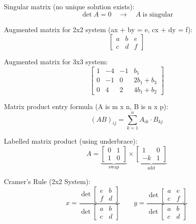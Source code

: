 Singular matrix (no unique solution exists):
$$\det A = 0 \quad \to \quad A \;\text{is singular}$$

Augmented matrix for 2x2 system (ax + by = e, cx + dy = f):
$$\left[ \begin{array}{cc|c} a & b & e \\ c & d & f \end{array} \right]$$

Augmented matrix for 3x3 system:
$$\left[ \begin{array}{ccc|c} 1 & -4 & -1 & b_1 \\ 0 & -1 & 0 & 2b_1 + b_3 \\ 0 & 4 & 2 & 4b_1 + b_2 \end{array} \right]$$

Matrix product entry formula (A is m x n, B is n x p):
$$(AB)_{ij} = \sum_{k=1}^n A_{ik} \cdot B_{kj}$$

Labelled matrix product (using underbrace):
$$A = \underbrace{\begin{bmatrix} 0 & 1 \\ 1 & 0 \end{bmatrix}}_{\text{swap}} \times \underbrace{\begin{bmatrix} 1 & 0 \\ -k & 1 \end{bmatrix}}_{\text{add}}$$

Cramer's Rule (2x2 System):
$$x = \frac{\det \begin{bmatrix} e & b \\ f & d \end{bmatrix}}{\det \begin{bmatrix} a & b \\ c & d \end{bmatrix}} \qquad y = \frac{\det \begin{bmatrix} a & e \\ c & f \end{bmatrix}}{\det \begin{bmatrix} a & b \\ c & d \end{bmatrix}}$$
